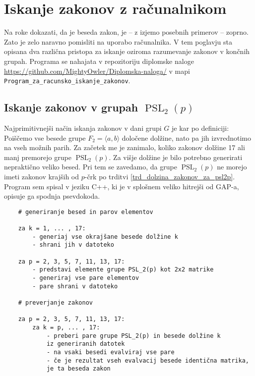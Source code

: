 \section{Iskanje zakonov z računalnikom}
\label{sec_racunalnisko_iskanje}

Na roke dokazati, da je beseda zakon, je -- z izjemo posebnih primerov -- zoprno. 
Zato je zelo naravno pomisliti na uporabo računalnika. 
V tem poglavju sta opisana dva različna pristopa za iskanje  oziroma razumevanje zakonov v končnih grupah. 
Programa se nahajata v repozitoriju diplomske naloge \url{https://github.com/MightyOwler/Diplomska-naloga/} v mapi \texttt{Program\_za\_racunsko\_iskanje\_zakonov}.

\subsection{Iskanje zakonov v grupah $\operatorname{PSL}_2(p)$} %

Najprimitivnejši način iskanja zakonov v dani grupi $G$ je kar po definiciji: Poiščemo vse besede grupe $F_2 = \langle a,b \rangle$ določene dolžine, nato pa jih izvrednotimo na vseh možnih parih.
Za začetek me je zanimalo, koliko zakonov dolžine 17 ali manj premorejo grupe $\operatorname{PSL}_2(p)$. Za višje dolžine je bilo potrebno generirati nepraktično veliko besed. Pri tem se zavedamo, da grupe $\operatorname{PSL}_2(p)$ ne morejo imeti zakonov krajših od $p$-črk po trditvi \ref{trd_dolzina_zakonov_za_psl2p}.
Program sem spisal v jeziku C++, ki je v splošnem veliko hitrejši od GAP-a, opisuje ga spodnja psevdokoda.

\begin{verbatim}
    # generiranje besed in parov elementov

    za k = 1, ... , 17:
        - generiaj vse okrajšane besede dolžine k
        - shrani jih v datoteko
    
    za p = 2, 3, 5, 7, 11, 13, 17:
        - predstavi elemente grupe PSL_2(p) kot 2x2 matrike
        - generiraj vse pare elementov
        - pare shrani v datoteko

    # preverjanje zakonov
    
    za p = 2, 3, 5, 7, 11, 13, 17:
        za k = p, ... , 17:
            - preberi pare grupe PSL_2(p) in besede dolžine k 
            iz generiranih datotek
            - na vsaki besedi evalviraj vse pare
            - če je rezultat vseh evalvacij besede identična matrika,
            je ta beseda zakon
\end{verbatim}

